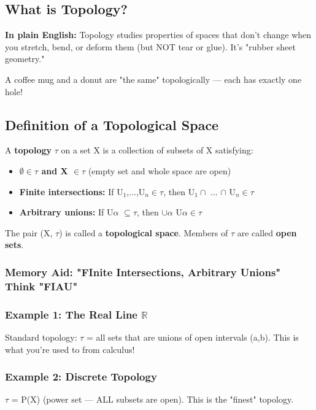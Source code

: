 \documentclass[12pt,a4paper,openany]{book}
\begin{document}
{{\subsection{What is Topology?}

\textbf{In plain English:} Topology studies properties of spaces that don't change when you stretch, bend, or deform them (but NOT tear or glue). It's "rubber sheet geometry."

A coffee mug and a donut are "the same" topologically — each has exactly one hole!

\subsection{Definition of a Topological Space}

A \textbf{topology} $\tau$ on a set X is a collection of subsets of X satisfying:

\begin{itemize}
  \item \textbf{$\emptyset\in\tau$ and X $\in\tau$} (empty set and whole space are open)
  \item \textbf{Finite intersections:} If U$_1$,...,U$_n\in\tau$, then U$_1\cap$ ... $\cap$ U$_n\in\tau$
  \item \textbf{Arbitrary unions:} If {U$\alpha$} $\subseteq\tau$, then $\cup\alpha$ U$\alpha\in\tau$
\end{itemize}

The pair (X, $\tau$) is called a \textbf{topological space}. Members of $\tau$ are called \textbf{open sets}.

\subsubsection{ Memory Aid: "FInite Intersections, Arbitrary Unions"  Think "FIAU"}

\subsubsection{Example 1: The Real Line $\mathbb{R}$}
Standard topology: $\tau$ = all sets that are unions of open intervals (a,b).
This is what you're used to from calculus!

\subsubsection{Example 2: Discrete Topology}
$\tau$ = P(X) (power set — ALL subsets are open). This is the "finest" topology.

}}
\end{document}
